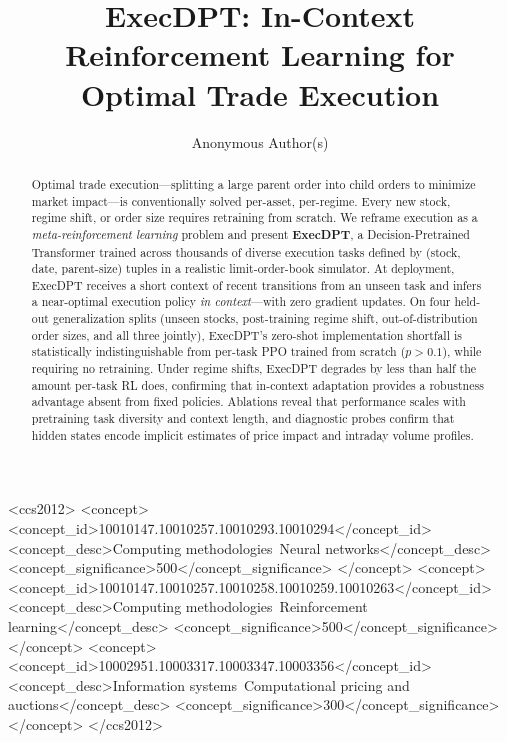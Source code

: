 \documentclass[sigconf,review,anonymous]{acmart}
\begin{document}
\title{ExecDPT: In-Context Reinforcement Learning for Optimal Trade Execution}

\author{Anonymous Author(s)}

\begin{abstract}
Optimal trade execution---splitting a large parent order into child orders to minimize market impact---is conventionally solved per-asset, per-regime.
Every new stock, regime shift, or order size requires retraining from scratch.
We reframe execution as a \emph{meta-reinforcement learning} problem and present \textbf{ExecDPT}, a Decision-Pretrained Transformer trained across thousands of diverse execution tasks defined by (stock, date, parent-size) tuples in a realistic limit-order-book simulator.
At deployment, ExecDPT receives a short context of recent transitions from an unseen task and infers a near-optimal execution policy \emph{in context}---with zero gradient updates.
On four held-out generalization splits (unseen stocks, post-training regime shift, out-of-distribution order sizes, and all three jointly), ExecDPT's zero-shot implementation shortfall is statistically indistinguishable from per-task PPO trained from scratch ($p > 0.1$), while requiring no retraining.
Under regime shifts, ExecDPT degrades by less than half the amount per-task RL does, confirming that in-context adaptation provides a robustness advantage absent from fixed policies.
Ablations reveal that performance scales with pretraining task diversity and context length, and diagnostic probes confirm that hidden states encode implicit estimates of price impact and intraday volume profiles.
\end{abstract}

\begin{CCSXML}
<ccs2012>
   <concept>
       <concept_id>10010147.10010257.10010293.10010294</concept_id>
       <concept_desc>Computing methodologies~Neural networks</concept_desc>
       <concept_significance>500</concept_significance>
   </concept>
   <concept>
       <concept_id>10010147.10010257.10010258.10010259.10010263</concept_id>
       <concept_desc>Computing methodologies~Reinforcement learning</concept_desc>
       <concept_significance>500</concept_significance>
   </concept>
   <concept>
       <concept_id>10002951.10003317.10003347.10003356</concept_id>
       <concept_desc>Information systems~Computational pricing and auctions</concept_desc>
       <concept_significance>300</concept_significance>
   </concept>
</ccs2012>
\end{CCSXML}
\end{document}
